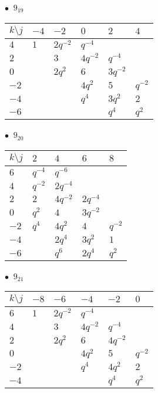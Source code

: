 %
\begin{minipage}{\linewidth}
$\bullet\ $ $9_{19}$ \vspace{0.5em} \\
\begin{tabular}{l|lllll}
$k \setminus j$ & $-4$ & $-2$ & $0$ & $2$ & $4$ \\
\hline
$4$ & $1$ & $2q^{-2}$ & $q^{-4}$ &  &  \\
$2$ &  & $3$ & $4q^{-2}$ & $q^{-4}$ &  \\
$0$ &  & $2q^{2}$ & $6$ & $3q^{-2}$ &  \\
$-2$ &  &  & $4q^{2}$ & $5$ & $q^{-2}$ \\
$-4$ &  &  & $q^{4}$ & $3q^{2}$ & $2$ \\
$-6$ &  &  &  & $q^{4}$ & $q^{2}$ \\
\end{tabular}
\vspace{2em}
\end{minipage}
%
\begin{minipage}{\linewidth}
$\bullet\ $ $9_{20}$ \vspace{0.5em} \\
\begin{tabular}{l|llll}
$k \setminus j$ & $2$ & $4$ & $6$ & $8$ \\
\hline
$6$ & $q^{-4}$ & $q^{-6}$ &  &  \\
$4$ & $q^{-2}$ & $2q^{-4}$ &  &  \\
$2$ & $2$ & $4q^{-2}$ & $2q^{-4}$ &  \\
$0$ & $q^{2}$ & $4$ & $3q^{-2}$ &  \\
$-2$ & $q^{4}$ & $4q^{2}$ & $4$ & $q^{-2}$ \\
$-4$ &  & $2q^{4}$ & $3q^{2}$ & $1$ \\
$-6$ &  & $q^{6}$ & $2q^{4}$ & $q^{2}$ \\
\end{tabular}
\vspace{2em}
\end{minipage}
%
\begin{minipage}{\linewidth}
$\bullet\ $ $9_{21}$ \vspace{0.5em} \\
\begin{tabular}{l|lllll}
$k \setminus j$ & $-8$ & $-6$ & $-4$ & $-2$ & $0$ \\
\hline
$6$ & $1$ & $2q^{-2}$ & $q^{-4}$ &  &  \\
$4$ &  & $3$ & $4q^{-2}$ & $q^{-4}$ &  \\
$2$ &  & $2q^{2}$ & $6$ & $4q^{-2}$ &  \\
$0$ &  &  & $4q^{2}$ & $5$ & $q^{-2}$ \\
$-2$ &  &  & $q^{4}$ & $4q^{2}$ & $2$ \\
$-4$ &  &  &  & $q^{4}$ & $q^{2}$ \\
\end{tabular}
\vspace{2em}
\end{minipage}
